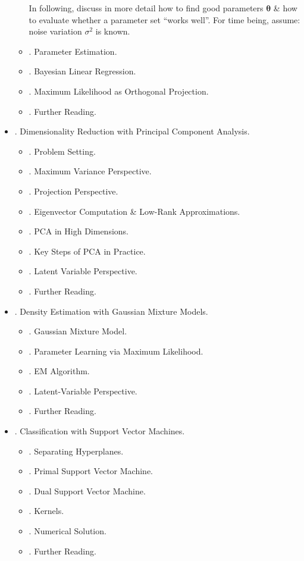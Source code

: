 \documentclass{article}
\begin{document}
\begin{itemize}
\begin{itemize}
		In following, discuss in more detail how to find good parameters $\boldsymbol{\theta}$ \& how to evaluate whether a parameter set ``works well''. For time being, assume: noise variation $\sigma^2$ is known.		
		\item {. Parameter Estimation.}
		\item {. Bayesian Linear Regression.}
		\item {. Maximum Likelihood as Orthogonal Projection.}
		\item {. Further Reading.}
	\end{itemize}
	\item {. Dimensionality Reduction with Principal Component Analysis.}
	\begin{itemize}
		\item {. Problem Setting.}
		\item {. Maximum Variance Perspective.}
		\item {. Projection Perspective.}
		\item {. Eigenvector Computation \& Low-Rank Approximations.}
		\item {. PCA in High Dimensions.}
		\item {. Key Steps of PCA in Practice.}
		\item {. Latent Variable Perspective.}
		\item {. Further Reading.}
	\end{itemize}
	\item {. Density Estimation with Gaussian Mixture Models.}
	\begin{itemize}
		\item {. Gaussian Mixture Model.}
		\item {. Parameter Learning via Maximum Likelihood.}
		\item {. EM Algorithm.}
		\item {. Latent-Variable Perspective.}
		\item {. Further Reading.}
	\end{itemize}
	\item {. Classification with Support Vector Machines.}
	\begin{itemize}
		\item {. Separating Hyperplanes.}
		\item {. Primal Support Vector Machine.}
		\item {. Dual Support Vector Machine.}
		\item {. Kernels.}
		\item {. Numerical Solution.}
		\item {. Further Reading.}
	\end{itemize}
\end{itemize}
\end{document}
